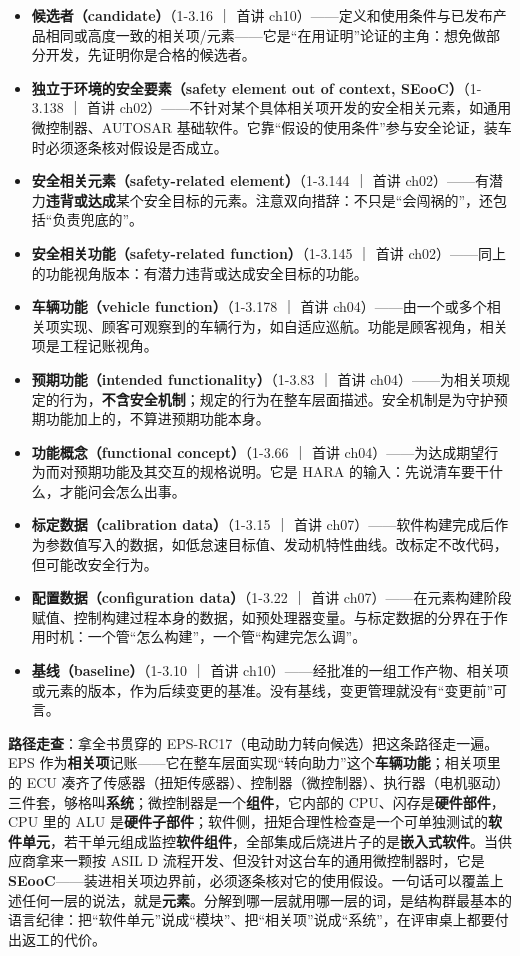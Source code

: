 \begin{itemize}
\item \textbf{候选者（candidate）}（1-3.16 ｜ 首讲 ch10）——定义和使用条件与已发布产品相同或高度一致的相关项/元素——它是“在用证明”论证的主角：想免做部分开发，先证明你是合格的候选者。
\item \textbf{独立于环境的安全要素（safety element out of context, SEooC）}（1-3.138 ｜ 首讲 ch02）——不针对某个具体相关项开发的安全相关元素，如通用微控制器、AUTOSAR 基础软件。它靠“假设的使用条件”参与安全论证，装车时必须逐条核对假设是否成立。
\item \textbf{安全相关元素（safety-related element）}（1-3.144 ｜ 首讲 ch02）——有潜力\textbf{违背或达成}某个安全目标的元素。注意双向措辞：不只是“会闯祸的”，还包括“负责兜底的”。
\item \textbf{安全相关功能（safety-related function）}（1-3.145 ｜ 首讲 ch02）——同上的功能视角版本：有潜力违背或达成安全目标的功能。
\item \textbf{车辆功能（vehicle function）}（1-3.178 ｜ 首讲 ch04）——由一个或多个相关项实现、顾客可观察到的车辆行为，如自适应巡航。功能是顾客视角，相关项是工程记账视角。
\item \textbf{预期功能（intended functionality）}（1-3.83 ｜ 首讲 ch04）——为相关项规定的行为，\textbf{不含安全机制}；规定的行为在整车层面描述。安全机制是为守护预期功能加上的，不算进预期功能本身。
\item \textbf{功能概念（functional concept）}（1-3.66 ｜ 首讲 ch04）——为达成期望行为而对预期功能及其交互的规格说明。它是 HARA 的输入：先说清车要干什么，才能问会怎么出事。
\item \textbf{标定数据（calibration data）}（1-3.15 ｜ 首讲 ch07）——软件构建完成后作为参数值写入的数据，如低怠速目标值、发动机特性曲线。改标定不改代码，但可能改安全行为。
\item \textbf{配置数据（configuration data）}（1-3.22 ｜ 首讲 ch07）——在元素构建阶段赋值、控制构建过程本身的数据，如预处理器变量。与标定数据的分界在于作用时机：一个管“怎么构建”，一个管“构建完怎么调”。
\item \textbf{基线（baseline）}（1-3.10 ｜ 首讲 ch10）——经批准的一组工作产物、相关项或元素的版本，作为后续变更的基准。没有基线，变更管理就没有“变更前”可言。
\end{itemize}

\textbf{路径走查}：拿全书贯穿的 EPS-RC17（电动助力转向候选）把这条路径走一遍。EPS 作为\textbf{相关项}记账——它在整车层面实现“转向助力”这个\textbf{车辆功能}；相关项里的 ECU 凑齐了传感器（扭矩传感器）、控制器（微控制器）、执行器（电机驱动）三件套，够格叫\textbf{系统}；微控制器是一个\textbf{组件}，它内部的 CPU、闪存是\textbf{硬件部件}，CPU 里的 ALU 是\textbf{硬件子部件}；软件侧，扭矩合理性检查是一个可单独测试的\textbf{软件单元}，若干单元组成监控\textbf{软件组件}，全部集成后烧进片子的是\textbf{嵌入式软件}。当供应商拿来一颗按 ASIL D 流程开发、但没针对这台车的通用微控制器时，它是 \textbf{SEooC}——装进相关项边界前，必须逐条核对它的使用假设。一句话可以覆盖上述任何一层的说法，就是\textbf{元素}。分解到哪一层就用哪一层的词，是结构群最基本的语言纪律：把“软件单元”说成“模块”、把“相关项”说成“系统”，在评审桌上都要付出返工的代价。


